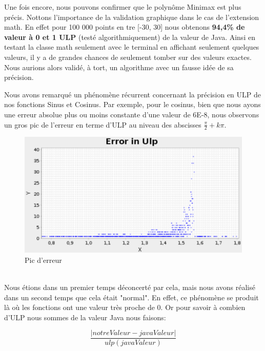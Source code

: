 \documentclass[12pt]{article}
\begin{document}
Une fois encore, nous pouvons confirmer que le polynôme Minimax est plus précis.
Nottons l'importance de la validation graphique dans le cas de l'extension math. En effet pour 100 000 points en tre [-30, 30] nous obtenons \textbf{94,4\% de valeur à 0 et 1 ULP}
(testé algorithmiquement) de la valeur de Java. Ainsi en testant la classe math seulement avec le terminal en affichant seulement quelques valeurs, il y a de grandes chances de seulement tomber sur
des valeurs exactes. Nous aurions alors validé, à tort, un algorithme avec un fausse idée de sa précision.


Nous avons remarqué un phénomène récurrent concernant la précision en ULP de nos fonctions Sinus et Cosinus. Par exemple, pour le cosinus,
bien que nous ayons une erreur absolue plus ou moins constante d'une valeur de 6E-8, nous observons un gros pic de l'erreur en terme d'ULP au niveau des
abscisses $\frac{\pi}{2} + k\pi$.\\
\begin{figure}[ht]
  \begin{center}
    \includegraphics[scale=0.28]{PicErrorUlp.png}
    \caption{Pic d'erreur}
    \label{Erreur en ulp du cos par Polynôme Minimax sur [-30, 30] avec 100 000 points}
  \end{center}
\end{figure}
\\
Nous étions dans un premier temps déconcerté par cela, mais nous avons réalisé dans un second temps que cela était "normal". En effet, ce phénomène se produit là où les fonctions
ont une valeur très proche de 0. Or pour savoir à combien d'ULP nous sommes de la valeur Java nous faisons:

\begin{center}
\begin{equation}
  \frac{|notreValeur - javaValeur|}{ulp(javaValeur)}
\end{equation}
\end{center}
\end{document}
